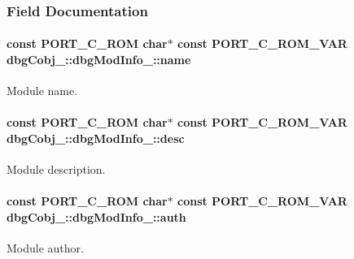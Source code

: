 \subsubsection{Field Documentation}
\hypertarget{structdbgCobj___1_1dbgModInfo___a1f1e63081ea74aa9cf12aad803004a20}{
\paragraph[{name}]{\setlength{\rightskip}{0pt plus 5cm}const P\-O\-R\-T\-\_\-\-C\-\_\-\-R\-O\-M char$\ast$ const P\-O\-R\-T\-\_\-\-C\-\_\-\-R\-O\-M\-\_\-\-V\-A\-R dbg\-Cobj\-\_\-\-::dbg\-Mod\-Info\-\_\-\-::name}}\label{structdbgCobj___1_1dbgModInfo___a1f1e63081ea74aa9cf12aad803004a20}


Module name. 

\hypertarget{structdbgCobj___1_1dbgModInfo___ac296c9d637c9b76a94e6a5034992e894}{
\paragraph[{desc}]{\setlength{\rightskip}{0pt plus 5cm}const P\-O\-R\-T\-\_\-\-C\-\_\-\-R\-O\-M char$\ast$ const P\-O\-R\-T\-\_\-\-C\-\_\-\-R\-O\-M\-\_\-\-V\-A\-R dbg\-Cobj\-\_\-\-::dbg\-Mod\-Info\-\_\-\-::desc}}\label{structdbgCobj___1_1dbgModInfo___ac296c9d637c9b76a94e6a5034992e894}


Module description. 

\hypertarget{structdbgCobj___1_1dbgModInfo___ac60151ee24fcc0df692a7408b5acc731}{
\paragraph[{auth}]{\setlength{\rightskip}{0pt plus 5cm}const P\-O\-R\-T\-\_\-\-C\-\_\-\-R\-O\-M char$\ast$ const P\-O\-R\-T\-\_\-\-C\-\_\-\-R\-O\-M\-\_\-\-V\-A\-R dbg\-Cobj\-\_\-\-::dbg\-Mod\-Info\-\_\-\-::auth}}\label{structdbgCobj___1_1dbgModInfo___ac60151ee24fcc0df692a7408b5acc731}


Module author. 

